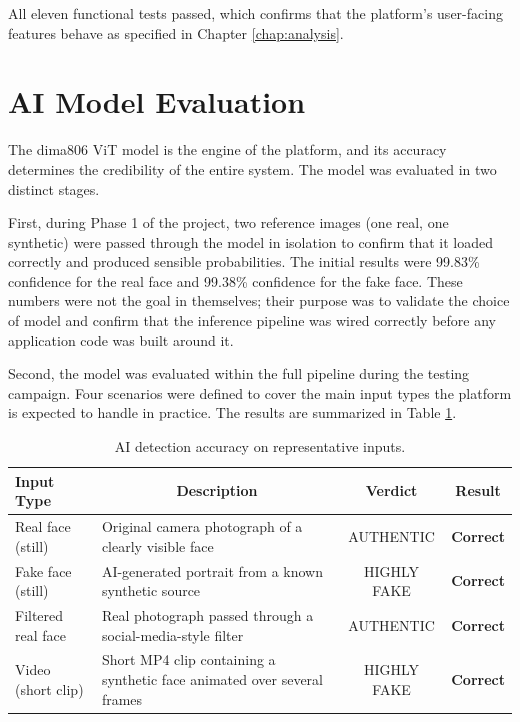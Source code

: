 All eleven functional tests passed, which confirms that the platform's user-facing features behave as specified in Chapter \ref{chap:analysis}.

\section{AI Model Evaluation}

The dima806 ViT model is the engine of the platform, and its accuracy determines the credibility of the entire system. The model was evaluated in two distinct stages.

First, during Phase 1 of the project, two reference images (one real, one synthetic) were passed through the model in isolation to confirm that it loaded correctly and produced sensible probabilities. The initial results were 99.83\% confidence for the real face and 99.38\% confidence for the fake face. These numbers were not the goal in themselves; their purpose was to validate the choice of model and confirm that the inference pipeline was wired correctly before any application code was built around it.

Second, the model was evaluated within the full pipeline during the testing campaign. Four scenarios were defined to cover the main input types the platform is expected to handle in practice. The results are summarized in Table \ref{tab:test-ai}.

\begin{table}[H]
\centering
\renewcommand{\arraystretch}{1.3}
\begin{tabular}{|p{3.5cm}|p{5.5cm}|c|c|}
\hline
\textbf{Input Type} & \multicolumn{1}{c|}{\textbf{Description}} & \textbf{Verdict} & \textbf{Result} \\
\hline
Real face (still) & Original camera photograph of a clearly visible face & AUTHENTIC & \textbf{Correct} \\
\hline
Fake face (still) & AI-generated portrait from a known synthetic source & HIGHLY FAKE & \textbf{Correct} \\
\hline
Filtered real face & Real photograph passed through a social-media-style filter & AUTHENTIC & \textbf{Correct} \\
\hline
Video (short clip) & Short MP4 clip containing a synthetic face animated over several frames & HIGHLY FAKE & \textbf{Correct} \\
\hline
\end{tabular}
\caption{AI detection accuracy on representative inputs.}
\label{tab:test-ai}
\end{table}


